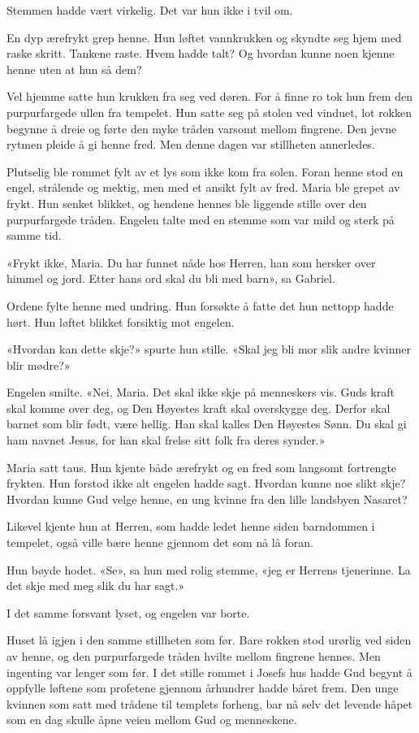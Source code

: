 Stemmen hadde vært virkelig. Det var hun ikke i tvil om.

En dyp ærefrykt grep henne. Hun løftet vannkrukken
og skyndte seg hjem med raske skritt. Tankene raste.
Hvem hadde talt? Og hvordan kunne noen kjenne henne uten at hun så dem?

Vel hjemme satte hun krukken fra seg ved døren.
For å finne ro tok hun frem den purpurfargede
ullen fra tempelet. Hun satte seg på stolen ved vinduet,
lot rokken begynne å dreie og førte den myke tråden
varsomt mellom fingrene. Den jevne rytmen pleide å gi henne fred.
Men denne dagen var stillheten annerledes.

Plutselig ble rommet fylt av et lys som ikke kom fra solen.
Foran henne stod en engel, strålende og mektig, men med et ansikt fylt av fred.
Maria ble grepet av frykt. Hun senket blikket,
og hendene hennes ble liggende stille over den purpurfargede tråden.
Engelen talte med en stemme som var mild og sterk på samme tid.

«Frykt ikke, Maria. Du har funnet nåde hos Herren,
han som hersker over himmel og jord. Etter hans ord skal du bli med barn»,
sa Gabriel.

Ordene fylte henne med undring.
Hun forsøkte å fatte det hun nettopp hadde hørt.
Hun løftet blikket forsiktig mot engelen.

«Hvordan kan dette skje?» spurte hun stille.
«Skal jeg bli mor slik andre kvinner blir mødre?»

Engelen smilte. «Nei, Maria. Det skal ikke skje på menneskers vis.
Guds kraft skal komme over deg, og Den Høyestes kraft skal overskygge deg.
Derfor skal barnet som blir født, være hellig.
Han skal kalles Den Høyestes Sønn.
Du skal gi ham navnet Jesus,
for han skal frelse sitt folk fra deres synder.»

Maria satt taus. Hun kjente både ærefrykt og en fred
som langsomt fortrengte frykten. Hun forstod ikke alt
engelen hadde sagt. Hvordan kunne noe slikt skje?
Hvordan kunne Gud velge henne, en ung kvinne fra den lille landsbyen Nasaret?

Likevel kjente hun at Herren, som hadde ledet henne
siden barndommen i tempelet, også ville bære henne gjennom det som nå lå foran.

Hun bøyde hodet.
«Se», sa hun med rolig stemme,
«jeg er Herrens tjenerinne. La det skje med meg slik du har sagt.»

I det samme forsvant lyset, og engelen var borte.

Huset lå igjen i den samme stillheten som før.
Bare rokken stod urørlig ved siden av henne,
og den purpurfargede tråden hvilte mellom fingrene hennes.
Men ingenting var lenger som før. I det stille rommet i
Josefs hus hadde Gud begynt å oppfylle løftene som
profetene gjennom århundrer hadde båret frem.
Den unge kvinnen som satt med trådene til templets forheng,
bar nå selv det levende håpet som en dag skulle åpne veien
mellom Gud og menneskene.

